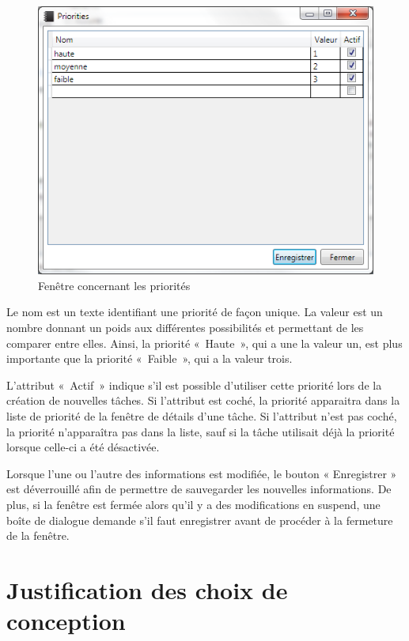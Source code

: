 \documentclass[letterpaper, oneside, 12pt, these, creativecommons]{thETS}
\begin{document}
\begin{figure}
	\includegraphics[scale=0.85]{fenetre_priorite.png}
	\caption{Fenêtre concernant les priorités}
\end{figure}

Le nom est un texte identifiant une priorité de façon unique. La valeur est un nombre donnant un poids aux différentes possibilités et permettant de les comparer entre elles. Ainsi, la priorité « Haute », qui a une la valeur un, est plus importante que la priorité « Faible », qui a la valeur trois.

L'attribut « Actif » indique s'il est possible d'utiliser cette priorité lors de la création de nouvelles tâches. Si l'attribut est coché, la priorité apparaitra dans la liste de priorité de la fenêtre de détails d'une tâche. Si l'attribut n'est pas coché, la priorité n'apparaîtra pas dans la liste, sauf si la tâche utilisait déjà la priorité lorsque celle-ci a été désactivée.

Lorsque l'une ou l'autre des informations est modifiée, le bouton « Enregistrer » est déverrouillé afin de permettre de sauvegarder les nouvelles informations. De plus, si la fenêtre est fermée alors qu'il y a des modifications en suspend, une boîte de dialogue demande s'il faut enregistrer avant de procéder à la fermeture de la fenêtre.

\newpage

\section{Justification des choix de conception}
\end{document}
